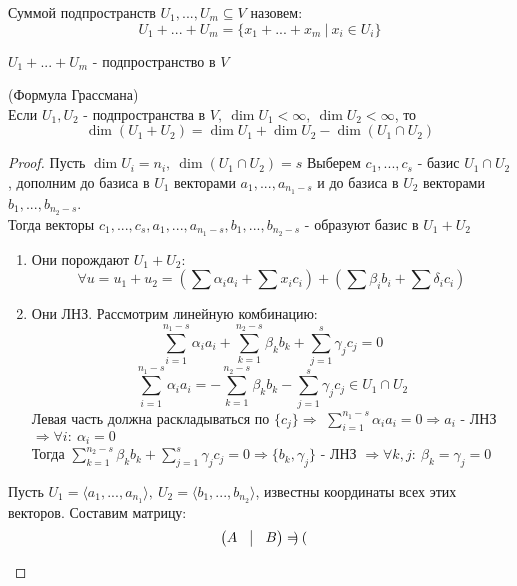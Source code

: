   \begin{definition}
    Суммой подпространств $U_1,...,U_m \subseteq V$ назовем: $$U_1 + ... + U_m = \{x_1+...+x_m \ | \ x_i \in U_i\}$$   
  \end{definition}
  \begin{subtheorem}
    $U_1 + ... + U_m$ - подпространство в $V$  
  \end{subtheorem}
  \begin{theorem} (Формула Грассмана)\\
    Если $U_1,U_2$ - подпространства в $V, \ \dim U_1 < \infty, \ \dim U_2 < \infty$, то 
    $$\dim (U_1+U_2) = \dim U_1 + \dim U_2 - \dim (U_1 \cap U_2)$$   
  \end{theorem}
  \begin{proof}
    Пусть $\dim U_i = n_i, \ \dim (U_1 \cap U_2) = s$
    Выберем $c_1,...,c_s$ - базис $U_1 \cap U_2$, дополним до базиса в $U_1$ векторами $a_1,...,a_{n_1-s}$ и до базиса в $U_2$ векторами $b_1,...,b_{n_2-s}$.\\ Тогда векторы $c_1,...,c_s,a_1,...,a_{n_1-s},b_1,...,b_{n_2-s}$ - образуют базис в $U_1 + U_2$
    \begin{enumerate}
      \item Они порождают $U_1 + U_2:$
      $$\forall u = u_1+u_2 = (\sum \alpha_i a_i + \sum x_i c_i) + (\sum \beta_i b_i + \sum \delta_i c_i)$$
      \item Они ЛНЗ. Рассмотрим линейную комбинацию: 
      $$\sum \limits_{i=1}^{n_1-s} \alpha_i a_i + \sum \limits_{k=1}^{n_2-s} \beta_k b_k + \sum \limits_{j=1}^{s} \gamma_j c_j = 0$$
      $$\sum \limits_{i=1}^{n_1-s} \alpha_i a_i = -\sum \limits_{k=1}^{n_2-s} \beta_k b_k - \sum \limits_{j=1}^{s} \gamma_j c_j \in U_1 \cap U_2$$
      Левая часть должна раскладываться по $\{c_j\} \Longrightarrow $ $\sum \limits_{i=1}^{n_1-s} \alpha_i a_i = 0 \Longrightarrow a_i$ - ЛНЗ $\Longrightarrow \forall i: \ \alpha_i = 0$ \\
      Тогда $\sum \limits_{k=1}^{n_2-s} \beta_k b_k + \sum \limits_{j=1}^{s} \gamma_j c_j = 0 \Longrightarrow \{b_k,\gamma_j\}$ - ЛНЗ $\Longrightarrow \forall k,j: \ \beta_k = \gamma_j = 0$  
    \end{enumerate}
    \begin{algorithm}
      Пусть $U_1 = \langle a_1,...,a_{n_1} \rangle, \ U_2 = \langle b_1,...,b_{n_2} \rangle$, известны координаты всех этих векторов. Составим матрицу:
      $$\begin{pmatrix}
        A & \vline & B
      \end{pmatrix} = \begin{pmatrix}

\end{pmatrix}$$
\end{algorithm}
\end{proof}
